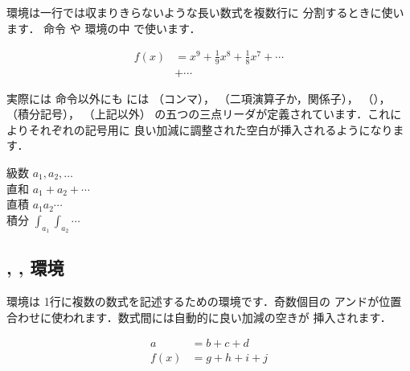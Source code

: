 環境は一行では収まりきらないような長い数式を複数行に
分割するときに使います． 命令 や 環境の中
で使います．

\begin{InOut}
\begin{displaymath}
 \begin{split}
  f(x) & = x^9 + \frac{1}{9}x^8 + 
     \frac{1}{8}x^7 + \cdots\\
  & + \cdots
 \end{split}
\end{displaymath}
\end{InOut}

\begin{Trick}
実際には  命令以外にも \AmSLaTeX には （コンマ），
（二項演算子か，関係子），
（），
（積分記号），
（上記以外）
の五つの三点リーダが定義されています．これによりそれぞれの記号用に
良い加減に調整された空白が挿入されるようになります．

\begin{InOut}
級数 $a_1, a_2,   \dotsc$\\
直和 $a_1 + a_2 + \dotsb$\\
直積 $a_1 a_2     \dotsm$\\ 
積分 $\int_{a_1}\int_{a_2}\dotsi$
\end{InOut}
\end{Trick}

%


\subsection{, , 環境}

環境は 1行に複数の数式を記述するための環境です．奇数個目の
アンドが位置合わせに使われます．数式間には自動的に良い加減の空きが
挿入されます．
\begin{InOut}
\begin{align}
   a &= b + c + d \\
f(x) &= g + h + i + j
\end{align} 
\end{InOut}

